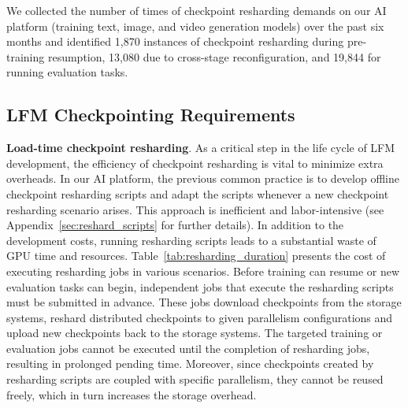 We collected the number of times of checkpoint resharding demands on our AI platform (training text, image, and video generation models) over the past six months and identified 1,870 instances of checkpoint resharding during pre-training resumption, 13,080 due to cross-stage reconfiguration, and 19,844 for running evaluation tasks. 


\subsection{LFM Checkpointing Requirements}\label{sec:bg_challenges}
\noindent \textbf{Load-time checkpoint resharding}.
As a critical step in the life cycle of LFM development, the efficiency of checkpoint resharding is vital to minimize extra overheads.
In our AI platform, the previous common practice is to develop %
offline checkpoint resharding scripts and adapt the scripts whenever a new checkpoint resharding scenario arises.
This approach is inefficient and labor-intensive (see Appendix~\ref{sec:reshard_scripts} for further details).
In addition to the development costs, running resharding scripts leads to a substantial waste of GPU time and resources.
Table~\ref{tab:resharding_duration} presents the cost of executing resharding jobs in various scenarios.
Before training can resume or new evaluation tasks can begin, independent jobs that execute the resharding scripts must be submitted in advance.
These jobs download checkpoints from the storage systems, reshard distributed checkpoints to given parallelism configurations and upload new checkpoints back to the storage systems.
The targeted training or evaluation jobs cannot be executed until the completion of resharding jobs, resulting in prolonged pending time.
Moreover, since checkpoints created by resharding scripts are coupled with specific parallelism, they cannot be reused freely, which in turn increases the storage overhead. 


